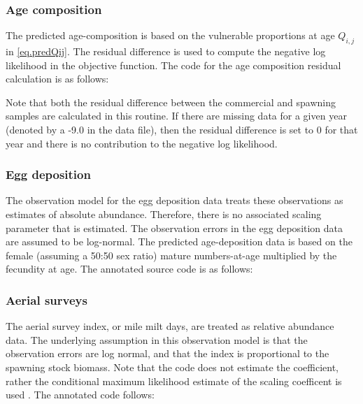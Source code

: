 \documentclass[12pt,letterpaper]{article}
\begin{document}
    \subsubsection{Age composition} %
    \label{ssub:age_composition}
    The predicted age-composition is based on the vulnerable proportions at age $Q_{i,j}$ in \eqref{eq.predQij}.  The residual difference is used to compute the negative log likelihood in the objective function.  The code for the age composition residual calculation is as follows:
    
    Note that both the residual difference between the commercial and spawning samples are calculated in this routine.  If there are missing data for a given year (denoted by a -9.0 in the data file), then the residual difference is set to 0 for that year and there is no contribution to the negative log likelihood.

    \subsubsection{Egg deposition} %
    \label{ssub:egg_deposition}
    The observation model for the egg deposition data treats these observations as estimates of absolute abundance.  Therefore, there is no associated scaling parameter that is estimated. The observation errors in the egg deposition data are assumed to be log-normal.  The predicted age-deposition data is based on the female (assuming a 50:50 sex ratio) mature numbers-at-age multiplied by the fecundity at age.  The annotated source code is as follows:
    


    \subsubsection{Aerial surveys} %
    \label{ssub:aerial_surveys}
    The aerial survey index, or mile milt days, are treated as relative abundance data.  The underlying assumption in this observation model is that the observation errors are log normal, and that the index is proportional to the spawning stock biomass.  Note that the code does not estimate the coefficient, rather the conditional maximum likelihood estimate of the scaling coefficent is used \citep[see][for a full explanation]{walters1994calculation}.  The annotated code follows:
     
\end{document}
